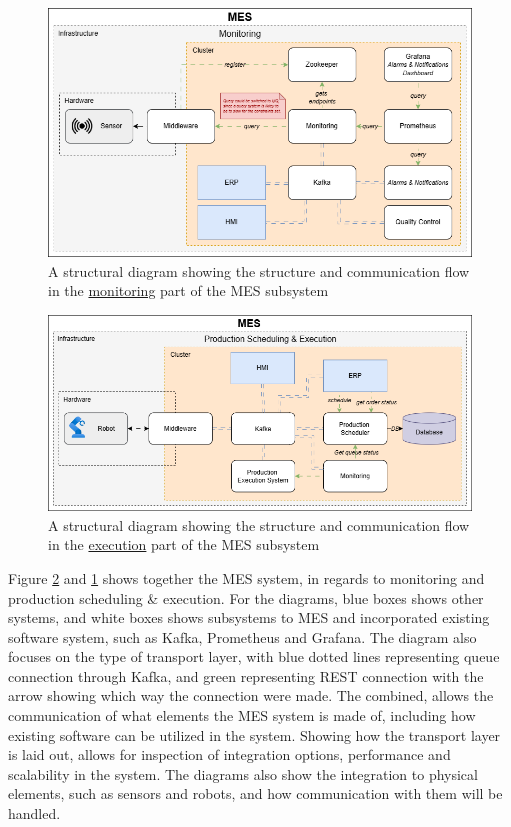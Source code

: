 \begin{figure}[H]
    \centering
    \caption{A structural diagram showing the structure and communication flow in the \underline{monitoring} part of the MES subsystem}
    \label{fig:systems_and_subsystems-mes_monitoring_systemdiagram}
    \includegraphics[width=1\linewidth]{images/MES_monitoring.png}
\end{figure}

\begin{figure}[H]
    \centering
    \caption{A structural diagram showing the structure and communication flow in the \underline{execution} part of the MES subsystem}
    \label{fig:systems_and_subsystems-mes_execution_systemdiagram}
    \includegraphics[width=1\linewidth]{images/mes-execution.png}
\end{figure}

Figure \ref{fig:systems_and_subsystems-mes_execution_systemdiagram} and \ref{fig:systems_and_subsystems-mes_monitoring_systemdiagram} shows together the MES system, in regards to monitoring and production scheduling \& execution.
For the diagrams, blue boxes shows other systems, and white boxes shows subsystems to MES and incorporated existing software system, such as Kafka, Prometheus and Grafana.
The diagram also focuses on the type of transport layer, with blue dotted lines representing queue connection through Kafka, and green representing REST connection with the arrow showing which way the connection were made.
The combined, allows the communication of what elements the MES system is made of, including how existing software can be utilized in the system. Showing how the transport layer is laid out, allows for inspection of integration options, performance and scalability in the system.
The diagrams also show the integration to physical elements, such as sensors and robots, and how communication with them will be handled.



